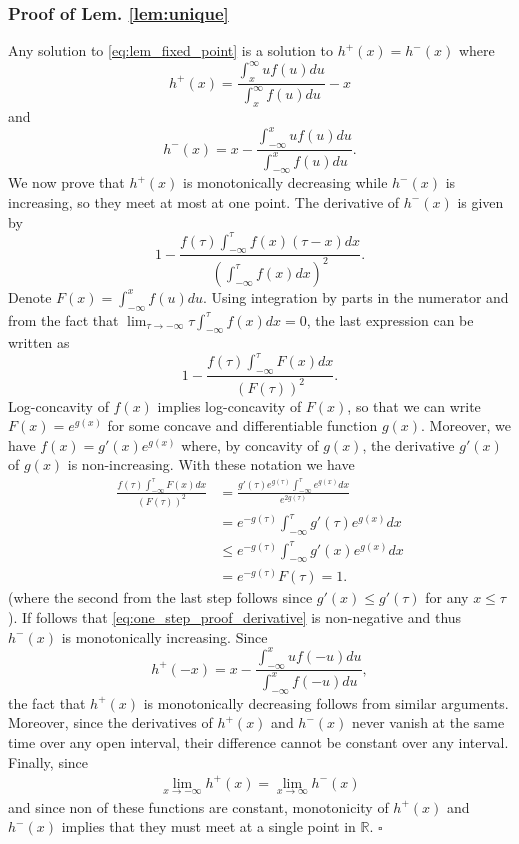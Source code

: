 \documentclass[letterpaper, conference,9pt]{IEEEtran}      %
\newcommand*{\QEDA}{\hfill\ensuremath{\square}}
\begin{document}
\subsubsection*{Proof of Lem. \ref{lem:unique}} 
Any solution to \eqref{eq:lem_fixed_point} is a solution to $h^+(x) = h^-(x)$ where
\[
h^+(x) = \frac{\int_x^\infty uf(u)du}{\int_x^\infty f(u)du} - x 
\]
and
\[
h^-(x) = x - \frac{\int_{-\infty}^x uf(u)du}{\int_{-\infty}^x f(u)du}.
\]
We now prove that $h^+(x)$ is monotonically decreasing while $h^-(x)$ is increasing, so they meet at most at one point. The derivative of $h^-(x)$ is given by
\begin{equation} 
\label{eq:one_step_proof_derivative}
1 - \frac{ f(\tau) \int_{-\infty}^\tau f(x) (\tau-x)dx } {\left( \int_{-\infty}^\tau f(x) dx \right)^2}.
\end{equation}
Denote $F(x) = \int_{-\infty}^x f(u)du$. Using integration by parts in the numerator and from the fact that $\lim_{\tau \rightarrow -\infty}  \tau \int_{-\infty}^\tau f(x) dx = 0$, the last expression can be written as
\[
1- \frac{ f(\tau) \int_{-\infty}^\tau F(x) dx}
 {\left( F(\tau) \right)^2}.
\]
Log-concavity of $f(x)$ implies log-concavity of $F(x)$, so that we can write $F(x) = e^{g(x)}$ for some concave and differentiable function $g(x)$. Moreover, we have $f(x) = g'(x)e^{g(x)}$ where, by concavity of $g(x)$, the derivative $g'(x)$ of $g(x)$ is non-increasing. With these notation we have
\begin{align*}
\frac{ f(\tau) \int_{-\infty}^\tau F(x) dx}
 {\left( F(\tau) \right)^2} & = \frac{g'(\tau)e^{g(\tau)} \int_{-\infty}^\tau e^{g(x)}dx }{ e^{2g(\tau)} } \\
 & = e^{-g(\tau)} \int_{-\infty}^\tau g'(\tau) e^{g(x)} dx  \\
 & \leq e^{-g(\tau)} \int_{-\infty}^\tau g'(x) e^{g(x)} dx \\
 & = e^{-g(\tau)} F(\tau) = 1.
\end{align*}
(where the second from the last step follows since $g'(x) \leq g'(\tau)$ for any $x\leq \tau$). If follows that \eqref{eq:one_step_proof_derivative} is non-negative and thus $h^-(x)$ is monotonically increasing. Since
\[
h^+(-x) = x - \frac{ \int_{-\infty}^{x} uf(-u)du}{ \int_{-\infty}^x f(-u) du }, 
\]
the fact that $h^+(x)$ is monotonically decreasing follows from similar arguments. Moreover, since the derivatives of $h^+(x)$ and $h^-(x)$ never vanish at the same time over any open interval, their difference cannot be constant over any interval. Finally, since 
\begin{align*}
 \lim_{x\rightarrow -\infty} h^+(x) =  \lim_{x\rightarrow \infty} h^-(x)
\end{align*}
and since non of these functions are constant, monotonicity of $h^+(x)$ and $h^-(x)$ implies that they must meet at a single point in $\mathbb R$. \QEDA
\end{document}
